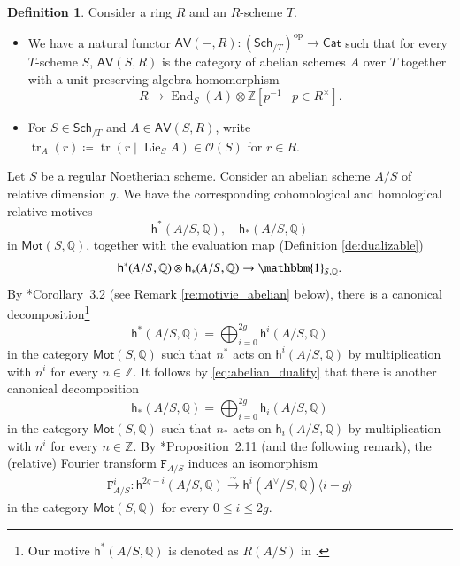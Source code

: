 \documentclass[12pt]{amsart}
\numberwithin{equation}{section}
\theoremstyle{plain}
\theoremstyle{definition}
\newtheorem{definition}[proposition]{Definition}
\theoremstyle{remark}
\renewcommand{\d}[1]{\mathbb{#1}}
\renewcommand{\r}[1]{\mathrm{#1}}
\newcommand{\s}[1]{\mathscr{#1}}
\renewcommand{\sf}[1]{\mathsf{#1}}
\renewcommand{\(}{\left(}
\renewcommand{\)}{\right)}
\newcommand{\res}{\mathbin{|}}
\newcommand{\ang}[1]{\langle{#1}\rangle}
\renewcommand{\leq}{\leqslant}
\newcommand{\dQ}{\d Q}
\newcommand{\dZ}{\d Z}
\newcommand{\sO}{\s O}
\newcommand{\sfh}{\sf h}
\newcommand{\tF}{\mathtt{F}}
\newcommand{\op}{\r{op}}
\newcommand{\Sch}{\sf{Sch}}
\newcommand{\AV}{\sf{AV}}
\newcommand{\Cat}{\sf{Cat}}
\newcommand{\Mot}{\sf{Mot}}
\DeclareMathOperator{\End}{End}
\DeclareMathOperator{\Lie}{Lie}
\DeclareMathOperator{\tr}{tr}
\begin{document}
\begin{definition}\label{de:category_av}
Consider a ring $R$ and an $R$-scheme $T$.
\begin{itemize}
  \item We have a natural functor $\AV(-,R)\colon(\Sch_{/T})^\op\to\Cat$ such that for every $T$-scheme $S$, $\AV(S,R)$ is the category of abelian schemes $A$ over $T$ together with a unit-preserving algebra homomorphism
      \[
      R\to\End_S(A)\otimes\dZ[p^{-1}\res p\in R^\times].
      \]

  \item For $S\in\Sch_{/T}$ and $A\in \AV(S,R)$, write $\tr_A(r)\coloneqq\tr(r\res\Lie_SA)\in\sO(S)$ for $r\in R$.
\end{itemize}
\end{definition}















Let $S$ be a regular Noetherian scheme. Consider an abelian scheme $A/S$ of relative dimension $g$. We have the corresponding cohomological and homological relative motives
\[
\sfh^*(A/S,\dQ),\quad\sfh_*(A/S,\dQ)
\]
in $\Mot(S,\dQ)$, together with the evaluation map (Definition \ref{de:dualizable})
\begin{align}\label{eq:abelian_duality}
\sfh^*(A/S,\dQ)\otimes\sfh_*(A/S,\dQ)\to\mathbbm{1}_{S,\dQ}.
\end{align}
By \cite{DM91}*{Corollary~3.2} (see Remark \ref{re:motivie_abelian} below), there is a canonical decomposition\footnote{Our motive $\sfh^*(A/S,\dQ)$ is denoted as $R(A/S)$ in \cite{DM91}.}
\[
\sfh^*(A/S,\dQ)=\bigoplus_{i=0}^{2g}\sfh^i(A/S,\dQ)
\]
in the category $\Mot(S,\dQ)$ such that $n^*$ acts on $\sfh^i(A/S,\dQ)$ by multiplication with $n^i$ for every $n\in\dZ$. It follows by \eqref{eq:abelian_duality} that there is another canonical decomposition
\[
\sfh_*(A/S,\dQ)=\bigoplus_{i=0}^{2g}\sfh_i(A/S,\dQ)
\]
in the category $\Mot(S,\dQ)$ such that $n_*$ acts on $\sfh_i(A/S,\dQ)$ by multiplication with $n^i$ for every $n\in\dZ$. By \cite{DM91}*{Proposition~2.11} (and the following remark), the (relative) Fourier transform $\tF_{A/S}$ induces an isomorphism
\begin{align}\label{eq:fourier}
\tF_{A/S}^i\colon\sfh^{2g-i}(A/S,\dQ)\xrightarrow\sim\sfh^{i}(A^\vee/S,\dQ)\ang{i-g}
\end{align}
in the category $\Mot(S,\dQ)$ for every $0\leq i\leq 2g$.
\end{document}
